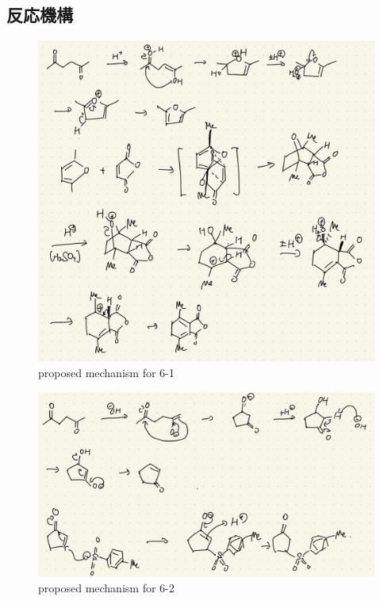 \documentclass{ltjsarticle}
\theoremstyle{definition}
\numberwithin{equation}{section}
\begin{document}
\subsection{反応機構}
\begin{figure}[htbp]
\begin{center}
\includegraphics[width = 15 cm]{mechanism_6-1.jpg}
\caption{proposed mechanism for 6-1}
\label{mechanism_6-1}
\end{center}
\end{figure}

\begin{figure}[htbp]
\begin{center}
\includegraphics[width = 15 cm]{mechanism_6-2.jpg}
\caption{proposed mechanism for 6-2}
\label{mechanism_6-2}
\end{center}
\end{figure}
\end{document}
